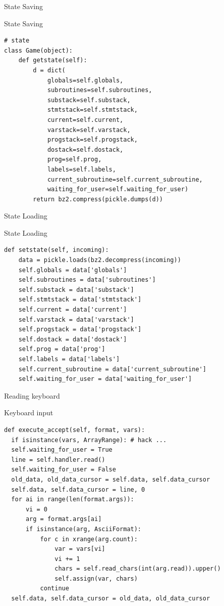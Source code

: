 \documentclass{beamer}
\def\py{
  \lstset{
     language=Python,
     extendedchars=true,
     basicstyle=\footnotesize\ttfamily,
     showstringspaces=false,
     showspaces=false,
     numbersep=9pt,
     tabsize=2,
     breaklines=true,
     showtabs=false,
     captionpos=b
  }
}
\begin{document}
\begin{frame}[fragile]{State Saving}

\begin{block}{State Saving}
\py
\begin{lstlisting}
# state
class Game(object):
    def getstate(self):
        d = dict(
            globals=self.globals,
            subroutines=self.subroutines,
            substack=self.substack,
            stmtstack=self.stmtstack,
            current=self.current,
            varstack=self.varstack,
            progstack=self.progstack,
            dostack=self.dostack,
            prog=self.prog,
            labels=self.labels,
            current_subroutine=self.current_subroutine,
            waiting_for_user=self.waiting_for_user)
        return bz2.compress(pickle.dumps(d))
\end{lstlisting}
\end{block}
\end{frame}

\begin{frame}[fragile]{State Loading}

\begin{block}{State Loading}
\py
\begin{lstlisting}
def setstate(self, incoming):
    data = pickle.loads(bz2.decompress(incoming))
    self.globals = data['globals']
    self.subroutines = data['subroutines']
    self.substack = data['substack']
    self.stmtstack = data['stmtstack']
    self.current = data['current']
    self.varstack = data['varstack']
    self.progstack = data['progstack']
    self.dostack = data['dostack']
    self.prog = data['prog']
    self.labels = data['labels']
    self.current_subroutine = data['current_subroutine']
    self.waiting_for_user = data['waiting_for_user']
\end{lstlisting}
\end{block}
\end{frame}


\begin{frame}[fragile]{Reading keyboard}

\begin{block}{Keyboard input}
\py
\begin{lstlisting}
def execute_accept(self, format, vars):
  if isinstance(vars, ArrayRange): # hack ...
  self.waiting_for_user = True
  line = self.handler.read()
  self.waiting_for_user = False
  old_data, old_data_cursor = self.data, self.data_cursor
  self.data, self.data_cursor = line, 0
  for ai in range(len(format.args)):
      vi = 0
      arg = format.args[ai]
      if isinstance(arg, AsciiFormat):
          for c in xrange(arg.count):
              var = vars[vi]
              vi += 1
              chars = self.read_chars(int(arg.read)).upper()
              self.assign(var, chars)
          continue
  self.data, self.data_cursor = old_data, old_data_cursor
\end{lstlisting}
\end{block}
\end{frame}
\end{document}
